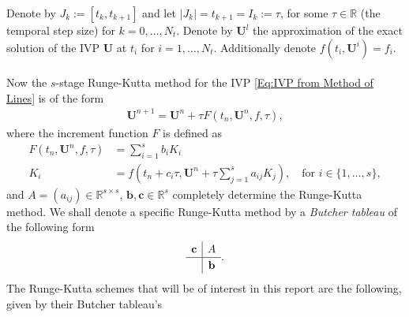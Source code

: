 \documentclass[a4paper,11pt]{article}
\theoremstyle{break}
\theoremstyle{break2}
\theoremstyle{break}
\theoremstyle{break2}
\newcommand{\R}{\mathbb{R}}
\begin{document}
Denote by $ J_k := [t_{k},t_{k+1}] $ and let $ |J_k| = t_{k+1} = I_{k} := \tau $, for some $ \tau \in \R $ (the temporal step size) for $ k = 0,\ldots,N_t $. Denote by $ \mathbf{U}^{l} $ the approximation of the exact solution of the IVP $ \mathbf{U} $ at $ t_i $ for $ i = 1,\ldots,N_t $. Additionally denote $ f(t_i,\mathbf{U}^i) = f_i $.
\\\\
Now the $ s $-stage Runge-Kutta method for the IVP \eqref{Eq:IVP from Method of Lines} is of the form
\begin{align*}
\mathbf{U}^{n+1} = \mathbf{U}^{n} + \tau F(t_n, \mathbf{U}^n, f, \tau),
\end{align*}
where the increment function $ F $ is defined as
\begin{align*}
F(t_n, \mathbf{U}^n, f, \tau) &= \sum_{i=1}^{s}b_iK_i \\
K_i &= f\left(t_n + c_i\tau, \mathbf{U}^n + \tau\sum_{j=1}^{s}a_{ij}K_j\right), \quad \text{for } i \in \{1,\ldots,s\},
\end{align*}
and $ A = (a_{ij}) \in \R^{s \times s} $, $ \mathbf{b}, \mathbf{c} \in \R^s $ completely determine the Runge-Kutta method. We shall denote a specific Runge-Kutta method by a \emph{Butcher tableau} of the following form
\begin{align*}
\renewcommand\arraystretch{1.2}
\begin{array}
{c|c}
\mathbf{c} &
A\\
\hline
& \mathbf{b}
\end{array}.
\end{align*}
The Runge-Kutta schemes that will be of interest in this report are the following, given by their Butcher tableau's
\end{document}
